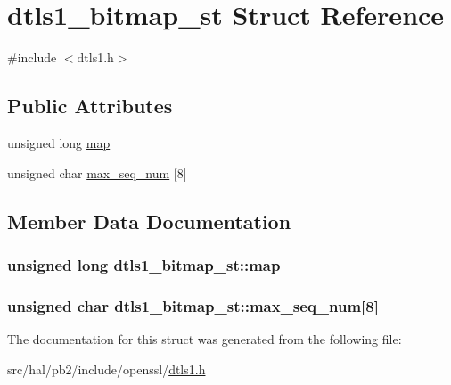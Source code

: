 \hypertarget{structdtls1__bitmap__st}{}\section{dtls1\+\_\+bitmap\+\_\+st Struct Reference}
\label{structdtls1__bitmap__st}


{\ttfamily \#include $<$dtls1.\+h$>$}

\subsection*{Public Attributes}
\begin{DoxyCompactItemize}
\item 
unsigned long \hyperlink{structdtls1__bitmap__st_a1b23acab32785f0a6780921565166622}{map}
\item 
unsigned char \hyperlink{structdtls1__bitmap__st_aab16a8e227150f8bb745ea006b798221}{max\+\_\+seq\+\_\+num} \mbox{[}8\mbox{]}
\end{DoxyCompactItemize}


\subsection{Member Data Documentation}
\subsubsection[{\texorpdfstring{map}{map}}]{\setlength{\rightskip}{0pt plus 5cm}unsigned long dtls1\+\_\+bitmap\+\_\+st\+::map}\hypertarget{structdtls1__bitmap__st_a1b23acab32785f0a6780921565166622}{}\label{structdtls1__bitmap__st_a1b23acab32785f0a6780921565166622}
\subsubsection[{\texorpdfstring{max\+\_\+seq\+\_\+num}{max_seq_num}}]{\setlength{\rightskip}{0pt plus 5cm}unsigned char dtls1\+\_\+bitmap\+\_\+st\+::max\+\_\+seq\+\_\+num\mbox{[}8\mbox{]}}\hypertarget{structdtls1__bitmap__st_aab16a8e227150f8bb745ea006b798221}{}\label{structdtls1__bitmap__st_aab16a8e227150f8bb745ea006b798221}


The documentation for this struct was generated from the following file\+:\begin{DoxyCompactItemize}
\item 
src/hal/pb2/include/openssl/\hyperlink{dtls1_8h}{dtls1.\+h}\end{DoxyCompactItemize}
